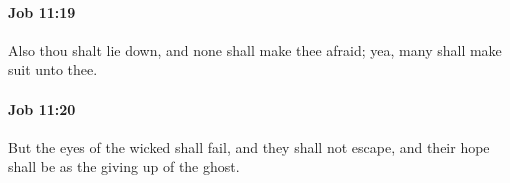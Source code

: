 		\paragraph{Job 11:19} %
			\label{JOB-11-19}

			Also thou shalt lie down, and none shall make thee afraid; yea, many shall make suit unto thee.


		\paragraph{Job 11:20} %
			\label{JOB-11-20}

			But the eyes of the wicked shall fail, and they shall not escape, and their hope shall be as the giving up of the ghost.

